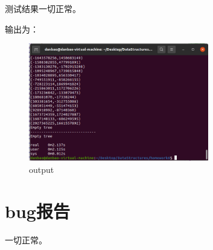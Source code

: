 \documentclass[UTF8]{ctexart}
\begin{document}
	测试结果一切正常。
	
	输出为： 
	
	\begin{figure}[H] %
		\centering %
		\includegraphics[width=0.7\textwidth]{fig4} %
		\caption{output} %
		\label{Fig.main2} %
	\end{figure}
	
	
	\section{bug报告}
	
	一切正常。
	
\end{document}
